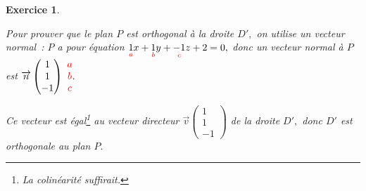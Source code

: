\documentclass[10pt]{article}
\newtheorem{exo}{Exercice}
\begin{document}
\begin{exo}
\begin{enumerate}
Pour prouver que le plan $P$ est orthogonal à la droite $D',$ on utilise un vecteur normal~: $P$ a pour équation $\underset{\textcolor{red}{a}}{1}x+\underset{\textcolor{red}{b}}{1}y+\underset{\textcolor{red}{c}}{-1}z+2=0,$ donc un vecteur normal à $P$ est
$\overrightarrow{n}\begin{pmatrix}1\\1\\-1\end{pmatrix}~\textcolor{red}{\begin{matrix}a\\b\\c\end{matrix}}.$

Ce vecteur est égal\footnote{La colinéarité suffirait.} au vecteur directeur $\overrightarrow{v}\begin{pmatrix}1\\1\\-1\end{pmatrix}$ de la droite $D',$ donc $D'$ est orthogonale au plan $P.$
\end{enumerate}


\end{exo}
\end{document}
